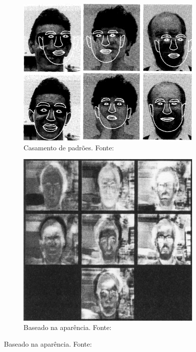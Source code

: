 \begin{figure}[htbp]
    \begin{subfigure}[t]{0.45\textwidth}
    \centering
    \includegraphics[width=\textwidth]{imagens/lanitis_template.png}
    \caption{Casamento de padrões. Fonte: }
    \end{subfigure}
    \hfill
    \begin{subfigure}[t]{0.45\textwidth}
    \centering
    \includegraphics[width=\textwidth]{imagens/turk_eigenfaces.png}
    \caption{Baseado na aparência. Fonte: }
    \end{subfigure}
\end{figure}